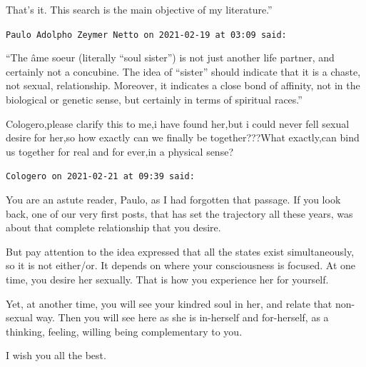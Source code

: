 \begin{footnotesize}
\begin{sffamily}
That's it. This search is the main objective of my literature.”


\hfill

\texttt{Paulo Adolpho Zeymer Netto on 2021-02-19 at 03:09 said: }

“The âme soeur (literally “soul sister”) is not just another life partner, and certainly not a concubine. The idea of “sister” should indicate that it is a chaste, not sexual, relationship. Moreover, it indicates a close bond of affinity, not in the biological or genetic sense, but certainly in terms of spiritual races.”

Cologero,please clarify this to me,i have found her,but i could never fell sexual desire for her,so how exactly can we finally be together???What exactly,can bind us together for real and for ever,in a physical sense?


\hfill

\texttt{Cologero on 2021-02-21 at 09:39 said: }

You are an astute reader, Paulo, as I had forgotten that passage. If you look back, one of our very first posts, that has set the trajectory all these years, was about that complete relationship that you desire.

But pay attention to the idea expressed that all the states exist simultaneously, so it is not either/or. It depends on where your consciousness is focused. At one time, you desire her sexually. That is how you experience her for yourself.

Yet, at another time, you will see your kindred soul in her, and relate that non-sexual way. Then you will see here as she is in-herself and for-herself, as a thinking, feeling, willing being complementary to you.

I wish you all the best.


\end{sffamily}\end{footnotesize}
